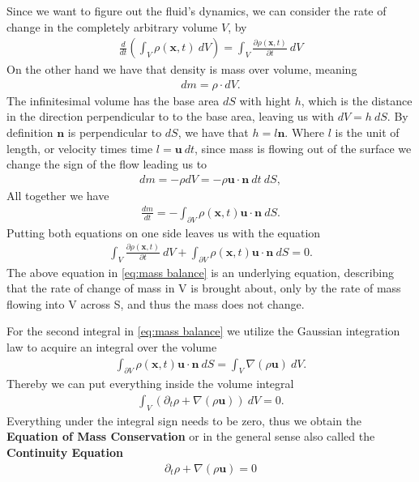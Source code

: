 Since we want to figure out the fluid's dynamics, we can consider the rate
of change in the completely arbitrary volume $V$, by
\begin{align}
    \frac{d}{dt}\left( \int_V \rho(\mathbf{x}, t)\ dV \right) = \int_V
    \frac{\partial \rho(\mathbf{x}, t)}{\partial t} \ dV
\end{align}
On the other hand we have that density is mass over volume, meaning
\begin{align}
    dm = \rho \cdot dV.
\end{align}
The infinitesimal volume has the base area $dS$ with hight $h$, which is the
distance in the direction perpendicular to to the base area, leaving us with
$dV = h\ dS$. By definition $\mathbf{n}$ is perpendicular to $dS$, we have
that $h = l \mathbf{n}$. Where $l$ is the unit of length, or velocity times
time $l = \mathbf{u}\ dt$, since mass is flowing out of the surface we
change the sign of the flow leading us to
\begin{align}
   dm  = -\rho dV = -\rho \mathbf{u} \cdot \mathbf{n}\ dt\ dS,
\end{align}
All together we have
\begin{align}
    \frac{dm}{dt} = -\int_{\partial V} \rho(\mathbf{x},t)
    \mathbf{u}\cdot\mathbf{n}\ dS.
\end{align}
Putting both equations on one side leaves us with the equation
\begin{align}\label{eq:mass balance}
     \int_V \frac{\partial \rho(\mathbf{x}, t)}{\partial t}\ dV
    +\int_{\partial V} \rho(\mathbf{x}, t) \mathbf{u}\cdot\mathbf{n}\ dS
    = 0.
\end{align}
The above equation in \ref{eq:mass balance} is an underlying equation, describing that the rate of
change of mass in V is brought about, only by the rate of mass flowing into
V across S, and thus the mass does not change.

For the second integral in \ref{eq:mass balance} we utilize the Gaussian
integration law to acquire an integral over the volume
\begin{align}
    \int_{\partial V} \rho(\mathbf{x}, t) \mathbf{u} \cdot \mathbf{n} \ dS =
    \int_V \nabla (\rho \mathbf{u})\ dV.
\end{align}
Thereby we can put everything inside the volume integral
\begin{align}
    \int_V \left(\partial_t \rho + \nabla(\rho \mathbf{u}) \right) \ dV = 0.
\end{align}
Everything under the integral sign needs to be zero, thus we obtain
the \textbf{Equation of Mass Conservation} or in the general sense also
called the \textbf{Continuity Equation}
\begin{align}\label{eq:continuity}
    \partial_t \rho + \nabla(\rho \mathbf{u}) = 0
\end{align}

